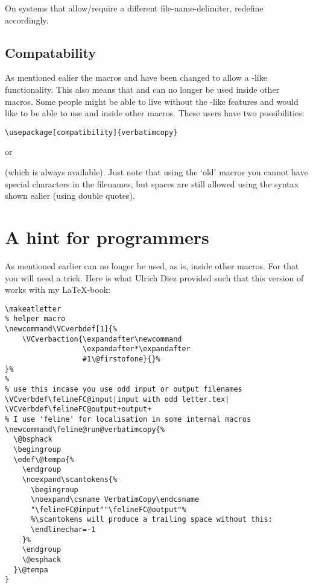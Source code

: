 \documentclass[11pt,a4paper,oldfontcommands,danish,english,article,oneside]{memoir}
\begin{document}
On systems that allow/require a different file-name-delimiter,
redefine  accordingly.

\subsection{Compatability}
\label{sec:compatability}

As mentioned ealier the macros  and
 have been changed to allow a
-like functionality. This also means that
 and  can no longer be used
inside other macros. Some people might be able to live without
the -like features and would like to be able to use
 and  inside other macros.
These users have two possibilities:
\begin{syntax}
  \verb+\usepackage[compatibility]{verbatimcopy}+
\end{syntax}
or
\begin{syntax}
\end{syntax}
\begin{syntax}
\end{syntax}
(which is always available). Just note that using the `old'
macros you cannot have special characters in the filenames, but
spaces are still allowed using the syntax shown ealier (using
double quotes).

\section{A hint for programmers}
\label{sec:hint-programmers}

As mentioned earlier  can no longer be used,
as is, inside other macros. For that you will need a trick. Here is
what Ulrich Diez provided such that this version of
 works with my LaTeX-book:
\begingroup
\footnotesize
\begin{verbatim}
\makeatletter
% helper macro
\newcommand\VCverbdef[1]{%
    \VCverbaction{\expandafter\newcommand
                  \expandafter*\expandafter
                  #1\@firstofone}{}%
}%
%
% use this incase you use odd input or output filenames
\VCverbdef\felineFC@input|input with odd letter.tex|
\VCverbdef\felineFC@output+output+
% I use 'feline' for localisation in some internal macros
\newcommand\feline@run@verbatimcopy{%
  \@bsphack
  \begingroup
  \edef\@tempa{%
    \endgroup
    \noexpand\scantokens{%
      \begingroup
      \noexpand\csname VerbatimCopy\endcsname
      "\felineFC@input""\felineFC@output"%
      %\scantokens will produce a trailing space without this:
      \endlinechar=-1
    }%
    \endgroup
    \@esphack
  }\@tempa
}
\end{verbatim}
\endgroup
\end{document}
